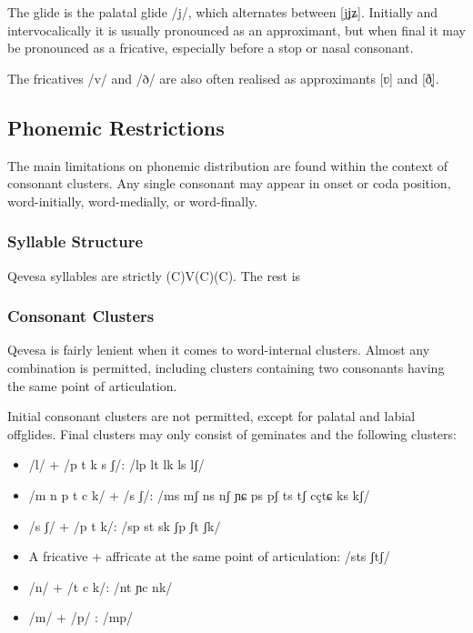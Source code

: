 \documentclass[grammar]{subfiles}
\begin{document}
The glide is the palatal glide /j/, which alternates between [j\tlde ʝ\tlde ʑ].
Initially and intervocalically it is usually pronounced as an approximant, but
when final it may be pronounced as a fricative, especially before a stop or
nasal consonant.  

The fricatives /v/ and /ð/ are also often realised as approximants [ʋ] and [ð̞].  


\subsection{Phonemic Restrictions}
\label{ssec:phonemic_restrictions}

The main limitations on phonemic distribution are found within the context of
consonant clusters.  Any single consonant may appear in onset or coda position,
word-initially, word-medially, or word-finally.  


\subsubsection{Syllable Structure}
\label{sssec:syllables}

Qevesa syllables are strictly (C)V(C)(C).  The rest is \tbw


\subsubsection{Consonant Clusters}
\label{sssec:consonant_clusters}

Qevesa is fairly lenient when it comes to word-internal clusters.  Almost any
combination is permitted, including clusters containing two consonants having
the same point of articulation. 

Initial consonant clusters are not permitted, except for palatal and labial
offglides.  Final clusters may only consist of geminates and the following
clusters: 

\begin{itemize}
  \item /l/ + /p t k s ʃ/: /lp lt lk ls lʃ/
  \item /m n p t c k/ + /s ʃ/: /ms mʃ ns nʃ ɲɕ ps pʃ ts tʃ cç\tlde tɕ ks kʃ/
  \item /s ʃ/ + /p t k/: /sp st sk ʃp ʃt ʃk/
  \item A fricative + affricate at the same point of articulation: /sts ʃtʃ/
  \item /n/ + /t c k/: /nt ɲc nk/
  \item /m/ + /p/ : /mp/
\end{itemize}
\end{document}
